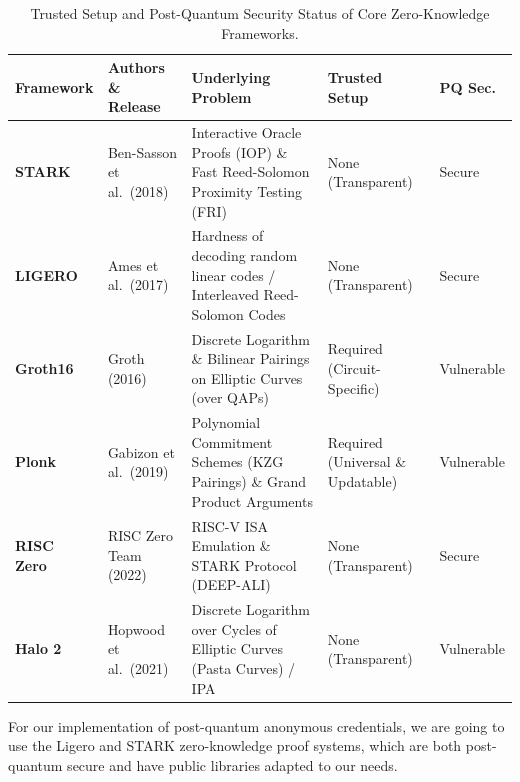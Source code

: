 \documentclass[binding=0.6cm,oneside,noexaminfo]{sapthesis}
\begin{document}
\begin{table}[H]
  \centering
  \caption{Trusted Setup and Post-Quantum Security Status of Core Zero-Knowledge Frameworks.}
  \label{tab:zk_systems_trusted_setup}
  \footnotesize
  \renewcommand{\arraystretch}{1.3}
  \begin{tabularx}{\textwidth}{|>{\raggedright\arraybackslash}p{}|>{\raggedright\arraybackslash}p{}|L|>{\raggedright\arraybackslash}p{0.19\textwidth}|>{\centering\arraybackslash}p{0.09\textwidth}|}
    \hline
    \textbf{Framework} & \textbf{Authors \& Release} & \textbf{Underlying Problem} & \textbf{Trusted Setup} & \textbf{PQ Sec.} \\ \hline
    \textbf{STARK}~\cite{BenSasson2018STARK} & Ben-Sasson et al.\ (2018) & Interactive Oracle Proofs (IOP) \& Fast Reed-Solomon Proximity Testing (FRI) & None (Transparent) & Secure \\ \hline
    \textbf{LIGERO}~\cite{Ames2017Ligero}    & Ames et al.\ (2017)       & Hardness of decoding random linear codes / Interleaved Reed-Solomon Codes & None (Transparent) & Secure \\ \hline
    \textbf{Groth16}~\cite{cryptoeprint:2016/260} & Groth (2016)         & Discrete Logarithm \& Bilinear Pairings on Elliptic Curves (over QAPs) & Required (Circuit-Specific) & Vulnerable \\ \hline
    \textbf{Plonk}~\cite{Gabizon2019Plonk}   & Gabizon et al.\ (2019)    & Polynomial Commitment Schemes (KZG Pairings) \& Grand Product Arguments & Required (Universal \& Updatable) & Vulnerable \\ \hline
    \textbf{RISC Zero}~\cite{RiscZero2026}   & RISC Zero Team (2022)    & RISC-V ISA Emulation \& STARK Protocol (DEEP-ALI) & None (Transparent) & Secure \\ \hline
    \textbf{Halo 2}~\cite{Hopwood2021Halo2}  & Hopwood et al.\ (2021)   & Discrete Logarithm over Cycles of Elliptic Curves (Pasta Curves) / IPA & None (Transparent) & Vulnerable \\ \hline
  \end{tabularx}
\end{table}

For our implementation of post-quantum anonymous credentials, we are going to use the Ligero and STARK zero-knowledge proof systems, 
which are both post-quantum secure and have public libraries adapted to our needs.
\end{document}

